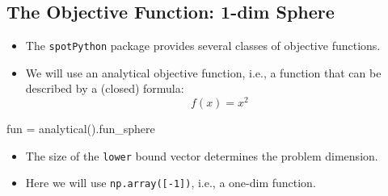 \documentclass[
  letterpaper,
  DIV=11,
  numbers=noendperiod]{scrreprt}
\newenvironment{Shaded}{\begin{snugshade}}{\end{snugshade}}
\newcommand{\NormalTok}[1]{\textcolor[rgb]{0.00,0.23,0.31}{#1}}
\newcommand{\OperatorTok}[1]{\textcolor[rgb]{0.37,0.37,0.37}{#1}}
\providecommand{\tightlist}{%
  \setlength{\itemsep}{0pt}\setlength{\parskip}{0pt}}\usepackage{longtable,booktabs,array}
\begin{document}
\subsection{The Objective Function: 1-dim
Sphere}\label{the-objective-function-1-dim-sphere}

\begin{itemize}
\tightlist
\item
  The \texttt{spotPython} package provides several classes of objective
  functions.
\item
  We will use an analytical objective function, i.e., a function that
  can be described by a (closed) formula: \[f(x) = x^2 \]
\end{itemize}

\begin{Shaded}
\begin{Highlighting}[]
\NormalTok{fun }\OperatorTok{=}\NormalTok{ analytical().fun\_sphere}
\end{Highlighting}
\end{Shaded}

\begin{itemize}
\tightlist
\item
  The size of the \texttt{lower} bound vector determines the problem
  dimension.
\item
  Here we will use \texttt{np.array({[}-1{]})}, i.e., a one-dim
  function.
\end{itemize}
\end{document}
